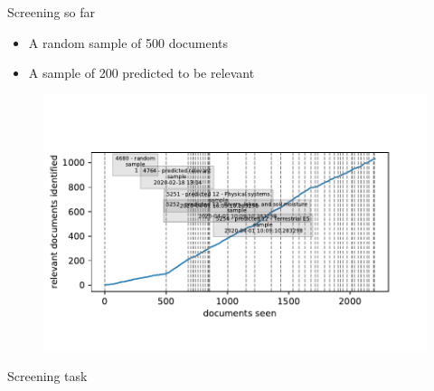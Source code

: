 \documentclass[9pt]{beamer}
\begin{document}
\begin{frame}{Screening so far}

\begin{itemize}
	\item A random sample of 500 documents
	\item A sample of 200 predicted to be relevant
	
\end{itemize}

\begin{figure}
	\includegraphics[width=\linewidth]{../plots/progress/reldocs_docs.pdf}
\end{figure}

\end{frame}

\begin{frame}{Screening task}


\end{frame}
\end{document}
